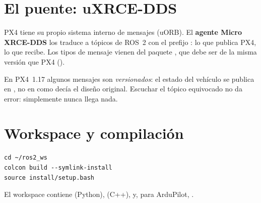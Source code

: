 \section{El puente: uXRCE-DDS}

PX4 tiene su propio sistema interno de mensajes (uORB). El \textbf{agente Micro XRCE-DDS} los traduce a
tópicos de ROS~2 con el prefijo :  lo que publica PX4,
 lo que recibe. Los tipos de mensaje vienen del paquete , que debe ser
de la misma versión que PX4 ().

\begin{leccion}
En PX4~1.17 algunos mensajes son \emph{versionados}: el estado del vehículo se publica en
, no en  como decía el diseño original.
Escuchar el tópico equivocado no da error: simplemente nunca llega nada.
\end{leccion}

\section{Workspace y compilación}

\begin{lstlisting}[style=bash]
cd ~/ros2_ws
colcon build --symlink-install
source install/setup.bash
\end{lstlisting}
El workspace contiene  (Python),  (C++),  y, para
ArduPilot, .
